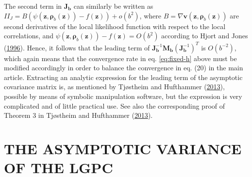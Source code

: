 \documentclass[
  12pt,
  letterpaper]{article}
\numberwithin{equation}{section}
\newcommand{\z}{\bm{z}}
\newcommand{\fv}{\bm{v}}
\newcommand{\frho}{\bm{\rho}}
\newcommand{\hh}{\bm{b}}
\newcommand{\Jb}{\bm{J}_{\hh}}
\newcommand{\Mb}{\bm{M}_{\hh}}
\begin{document}
The second term in \(\Jb\) can similarly be written as \(II_J = B(\psi(\z, \frho_b(\z)) - f(\z)) + o(b^2)\), where \(B = \nabla \fv(\z, \frho_b(\z))\) are second derivatives of the local likelihood function with respect to the local correlations, and \(\psi(\z, \frho_b(\z)) - f(\z) = O(b^2)\) according to Hjort and Jones (\protect\hyperlink{ref-hjort1996locally}{1996}). Hence, it follows that the leading term of \(\Jb^{-1}\Mb(\Jb^{-1})^T\) is \(O(b^{-2})\), which again means that the convergence rate in eq. \eqref{eq:fixed-h} above must be modified accordingly in order to balance the convergence in eq. (20) in the main article. Extracting an analytic expression for the leading term of the asymptotic covariance matrix is, as mentioned by Tjøstheim and Hufthammer (\protect\hyperlink{ref-tjostheim2013local}{2013}), possible by means of symbolic manipulation software, but the expression is very complicated and of little practical use. See also the corresponding proof of Theorem 3 in Tjøstheim and Hufthammer (\protect\hyperlink{ref-tjostheim2013local}{2013}).

\hypertarget{app-asvar}{%
\section{THE ASYMPTOTIC VARIANCE OF THE LGPC}\label{app-asvar}}
\end{document}
